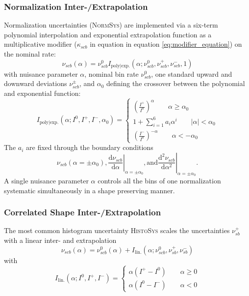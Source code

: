 \subsubsection{Normalization Inter-/Extrapolation}
Normalization uncertainties (\textsc{NormSys}) are implemented via a six-term polynomial interpolation and exponential extrapolation function as a multiplicative modifier ($\kappa_{scb}$ in equation in equation \ref{eq:modifier_equation}) on the nominal rate:
\begin{equation}
    \nu_{scb}(\alpha)=\nu_{scb}^0 I_\text{poly|exp.} (\alpha; \nu_{scb}^0, \nu_{scb}^+, \nu_{scb}^-, 1)
\end{equation}
with nuisance parameter $\alpha$, nominal bin rate $\nu_{scb}^0$, one standard upward and downward deviations $\nu_{scb}^\pm$, and $\alpha_0$ defining the crossover between the polynomial and exponential function:
\begin{equation}
    I_\text{poly|exp.}(\alpha; I^0, I^+, I^-, \alpha_0) =
    \begin{cases} 
        \left(\frac{I^+}{I^0}\right)^{\alpha} \qquad \alpha \geq \alpha_0 \\
        1 + \sum_{i=1}^6 a_i \alpha^i \qquad |\alpha| < \alpha_0          \\
        \left(\frac{I^-}{I^0}\right)^{-\alpha} \qquad \alpha < -\alpha_0
    \end{cases}
\end{equation} 
The $a_i$ are fixed through the boundary conditions
\begin{equation}
    \nu_{scb}(\alpha=\pm\alpha_0), \left.\frac{\mathrm{d}\nu_{scb}}{\mathrm{d}\alpha}\right|_{\alpha=\pm\alpha_0}, \mathrm{ and } \left.\frac{\mathrm{d}^2\nu_{scb}}{\mathrm{d}\alpha^2}\right|_{\alpha=\pm\alpha_0}.
\end{equation}
A single nuisance parameter $\alpha$ controls all the bins of one normalization systematic simultaneously in a shape preserving manner.

\subsubsection{Correlated Shape Inter-/Extrapolation}
The most common histogram uncertainty \textsc{HistoSys} scales the uncertainties $\nu_{sb}^+$  with a linear inter- and extrapolation
\begin{equation}
    \nu_{scb}(\alpha) = \nu_{scb}^0(\alpha) + I_\text{lin.} (\alpha; \nu_{scb}^0, \nu_{sb}^+, \nu_{sb}^-)
\end{equation}
with
\begin{equation}
    I_\text{lin.}(\alpha; I^0, I^+, I^-) =
    \begin{cases}
        \alpha(I^+ - I^0) \qquad \alpha \geq 0 \\
        \alpha(I^0 - I^-) \qquad \alpha < 0
    \end{cases}
\end{equation}


